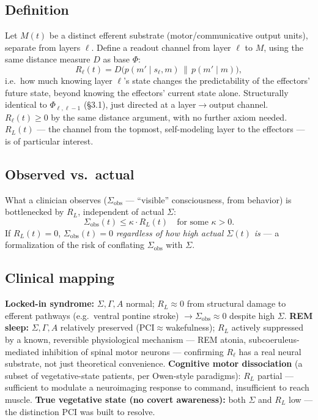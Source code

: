 \documentclass[11pt]{article}
\begin{document}
\subsection*{Definition}
Let $M(t)$ be a distinct efferent substrate (motor/communicative output units), separate from layers $\ell$. Define a readout channel from layer $\ell$ to $M$, using the same distance measure $D$ as base $\Phi$:
\[
R_\ell(t) = D\big(p(m'\mid s_\ell,m)\,\|\,p(m'\mid m)\big),
\]
i.e.\ how much knowing layer $\ell$'s state changes the predictability of the effectors' future state, beyond knowing the effectors' current state alone. Structurally identical to $\Phi_{\ell,\ell-1}$ (\S3.1), just directed at a layer$\to$output channel. $R_\ell(t)\ge0$ by the same distance argument, with no further axiom needed. $R_L(t)$ --- the channel from the topmost, self-modeling layer to the effectors --- is of particular interest.

\subsection*{Observed vs.\ actual}
What a clinician observes ($\Sigma_{\text{obs}}$ --- ``visible'' consciousness, from behavior) is bottlenecked by $R_L$, independent of actual $\Sigma$:
\[
\Sigma_{\text{obs}}(t) \le \kappa\cdot R_L(t) \quad \text{for some } \kappa>0.
\]
If $R_L(t)=0$, $\Sigma_{\text{obs}}(t)=0$ \emph{regardless of how high actual $\Sigma(t)$ is} --- a formalization of the risk of conflating $\Sigma_{\text{obs}}$ with $\Sigma$.

\subsection*{Clinical mapping}
\textbf{Locked-in syndrome:} $\Sigma,\Gamma,A$ normal; $R_L\approx0$ from structural damage to efferent pathways (e.g.\ ventral pontine stroke) $\to\Sigma_{\text{obs}}\approx0$ despite high $\Sigma$. \textbf{REM sleep:} $\Sigma,\Gamma,A$ relatively preserved (PCI$\approx$wakefulness); $R_L$ actively suppressed by a known, reversible physiological mechanism --- REM atonia, subcoeruleus-mediated inhibition of spinal motor neurons --- confirming $R_\ell$ has a real neural substrate, not just theoretical convenience. \textbf{Cognitive motor dissociation} (a subset of vegetative-state patients, per Owen-style paradigms): $R_L$ partial --- sufficient to modulate a neuroimaging response to command, insufficient to reach muscle. \textbf{True vegetative state (no covert awareness):} both $\Sigma$ and $R_L$ low --- the distinction PCI was built to resolve.
\end{document}
